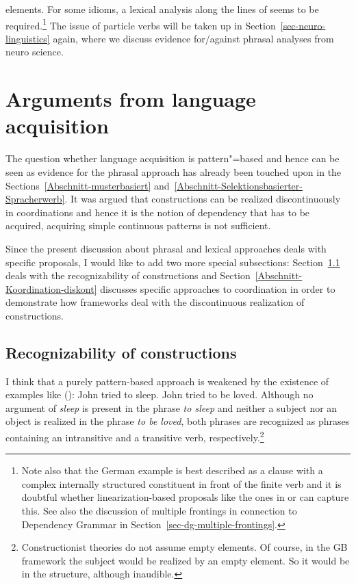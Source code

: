 \begin{exe}
\begin{xlist}[iv.]
\begin{exe}
\begin{xlist}[iv.]
elements. For some idioms, a lexical analysis along the lines of  seems to be
required.\footnote{Note also that the German example is best described as a clause with a complex internally 
  structured constituent in front of the finite verb and it is doubtful whether linearization-based
  proposals like the ones in  or  can capture
  this. See also the discussion of multiple frontings in connection to Dependency Grammar in Section~\ref{sec-dg-multiple-frontings}.
}
The issue of particle verbs will be taken up in Section~\ref{sec-neuro-linguistics} again, where we
discuss evidence for/against phrasal analyses from neuro science.



\section{Arguments from language acquisition}
\label{sec-acquisition}

The question whether language acquisition is pattern"=based and hence can be seen as evidence for
the phrasal approach has already been touched upon in the Sections~\ref{Abschnitt-musterbasiert}
and~\ref{Abschnitt-Selektionsbasierter-Spracherwerb}. It was argued that constructions can be
realized discontinuously in coordinations and hence it is the notion of
dependency that has to be acquired, acquiring simple continuous patterns is not sufficient.

Since the present discussion about phrasal and lexical approaches deals with specific proposals, I would like
to add two more special subsections: Section~\ref{sec-recognizability-of-constructions} deals with
the recognizability of constructions and Section~\ref{Abschnitt-Koordination-diskont} discusses specific approaches to coordination
in order to demonstrate how frameworks deal with the discontinuous realization of constructions.


\subsection{Recognizability of constructions}
\label{sec-recognizability-of-constructions}
 
I think that a purely pattern-based approach is weakened by the existence of examples like ():
\eal
\ex John tried to sleep.
\ex John tried to be loved.
\zl
Although no argument of \emph{sleep} is present in the phrase \emph{to sleep} and neither a subject
nor an object is realized in the phrase \emph{to be loved}, both phrases are recognized as phrases
containing an intransitive and a transitive verb, respectively.\footnote{
Constructionist theories do not assume empty elements. Of course, in the GB framework the subject
would be realized by an empty element. So it would be in the structure, although inaudible.%
}  


\end{xlist}
\end{exe}
\end{xlist}
\end{exe}
